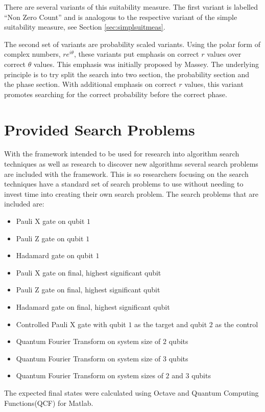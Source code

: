 There are several variants of this suitability measure.
The first variant is labelled ``Non Zero Count'' and is analogous to the respective variant of the simple suitability measure, see Section \ref{sec:simplsuitmeas}.

The second set of variants are probability scaled variants.
Using the polar form of complex numbers, $re^{i\theta}$, these variants put emphasis on correct $r$ values over correct $\theta$ values.
This emphasis was initially proposed by Massey\cite{masseythesis}.
The underlying principle is to try split the search into two section, the probability section and the phase section.
With additional emphasis on correct $r$ values, this variant promotes searching for the correct probability before the correct phase.

\section{Provided Search Problems}
\label{sec:provsearchprobs}
With the framework intended to be used for research into algorithm search techniques as well as research to discover new algorithms several search problems are included with the framework.
This is so researchers focusing on the search techniques have a standard set of search problems to use without needing to invest time into creating their own search problem.
The search problems that are included are:
\begin{itemize}
 \item Pauli X gate on qubit $1$
 \item Pauli Z gate on qubit $1$
 \item Hadamard gate on qubit $1$
 \item Pauli X gate on final, highest significant qubit
 \item Pauli Z gate on final, highest significant qubit
 \item Hadamard gate on final, highest significant qubit
 \item Controlled Pauli X gate with qubit $1$ as the target and qubit $2$ as the control
 \item Quantum Fourier Transform on system size of $2$ qubits
 \item Quantum Fourier Transform on system size of $3$ qubits
 \item Quantum Fourier Transform on system sizes of $2$ and $3$ qubits
\end{itemize}

The expected final states were calculated using Octave\cite{octweb} and Quantum Computing Functions(QCF) for Matlab\cite{qcfweb}.

